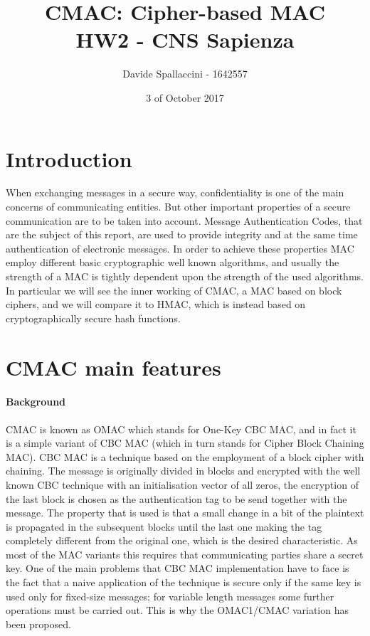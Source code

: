 \documentclass[11pt]{article}
\begin{document}
\title{CMAC: Cipher-based MAC\\ HW2 - CNS Sapienza}
\author{Davide Spallaccini - 1642557}
\date{3 of October 2017}
\maketitle


\section{Introduction}
When exchanging messages in a secure way, confidentiality is one of the main concerns of communicating entities. But other important properties of a secure communication are to be taken into account. Message Authentication Codes, that are the subject of this report, are used to provide integrity and at the same time authentication of electronic messages. In order to achieve these properties MAC employ different basic cryptographic well known algorithms, and usually the strength of a MAC is tightly dependent upon the strength of the used algorithms. In particular we will see the inner working of CMAC, a MAC based on block ciphers, and we will compare it to HMAC, which is instead based on cryptographically secure hash functions.

\section{CMAC main features}
\paragraph*{Background}
CMAC is known as OMAC which stands for One-Key CBC MAC, and in fact it is a simple variant of CBC MAC (which in turn stands for Cipher Block Chaining MAC). CBC MAC is a technique based on the employment of a block cipher with chaining. The message is originally divided in blocks and encrypted with the well known CBC technique with an initialisation vector of all zeros, the encryption of the last block is chosen as the authentication tag to be send together with the message. The property that is used is that a small change in a bit of the plaintext is propagated in the subsequent blocks until the last one making the tag completely different from the original one, which is the desired characteristic. As most of the MAC variants this requires that communicating parties share a secret key. One of the main problems that CBC MAC implementation have to face is the fact that a naive application of the technique is secure only if the same key is used only for fixed-size messages; for variable length messages some further operations must be carried out. This is why the OMAC1/CMAC variation has been proposed.
\end{document}
